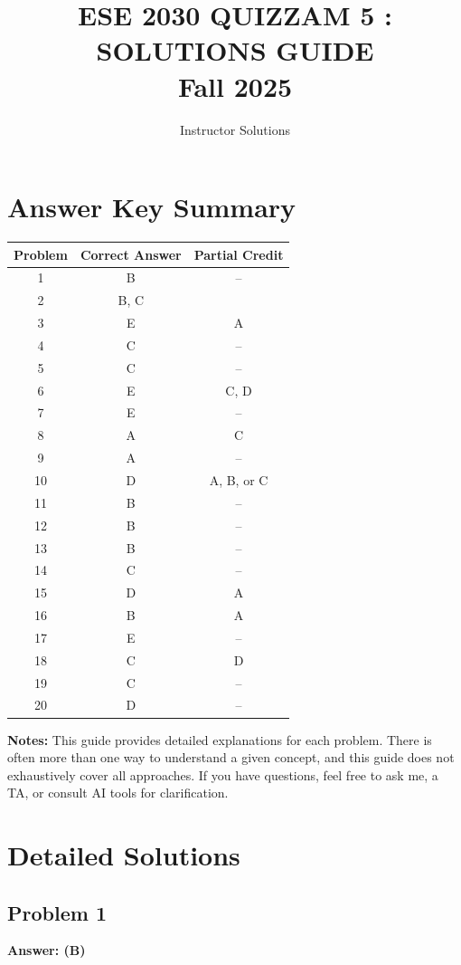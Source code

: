 \documentclass[12pt]{amsart}
\title{ESE 2030 QUIZZAM 5 : SOLUTIONS GUIDE\\Fall 2025}
\author{Instructor Solutions}
\newcommand{\correct}[1]{{\color{correctgreen}\textbf{#1}}}
\begin{document}
\maketitle

\section*{Answer Key Summary}
\begin{center}
\begin{tabular}{|c|c|c|}
\hline
Problem & Correct Answer & Partial Credit \\
\hline
1 & B & -- \\
2 & B, C & \\
3 & E & A  \\
4 & C & -- \\
5 & C & -- \\
6 & E & C, D \\
7 & E & -- \\
8 & A & C  \\
9 & A & -- \\
10 & D & A, B, or C \\
11 & B & -- \\
12 & B & -- \\
13 & B & -- \\
14 & C & -- \\
15 & D & A  \\
16 & B & A  \\
17 & E & -- \\
18 & C & D  \\
19 & C & -- \\
20 & D & -- \\
\hline
\end{tabular}
\end{center}

\textbf{Notes:} This guide provides detailed explanations for each problem. There is often more than one way to understand a given concept, and this guide does not exhaustively cover all approaches. If you have questions, feel free to ask me, a TA, or consult AI tools for clarification.

\newpage

\section*{Detailed Solutions}

\subsection*{Problem 1}
\correct{Answer: (B)}
\end{document}
